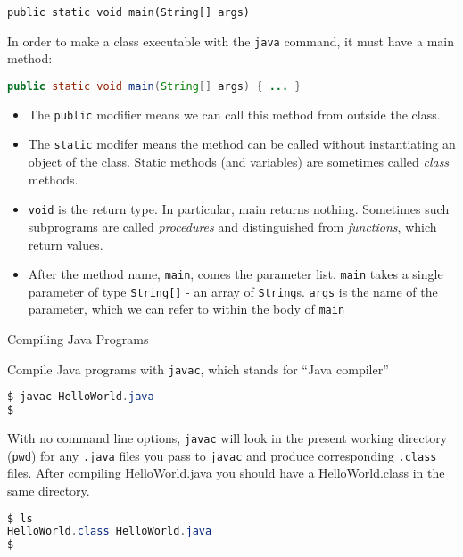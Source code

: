 \documentclass{beamer}
\begin{document}
\begin{frame}[fragile]{{\tt public static void main(String[] args)}}


In order to make a class executable with the {\tt java} command, it must have a main method:
\begin{lstlisting}[language=Java]
public static void main(String[] args) { ... }
\end{lstlisting}
\vspace{-.1in}
\begin{itemize}
\item The {\tt public} modifier means we can call this method from outside the class.
\item The {\tt static} modifer means the method can be called without instantiating an object of the class.  Static methods (and variables) are sometimes called {\it class} methods.
\item {\tt void} is the return type.  In particular, main returns nothing.  Sometimes such subprograms are called {\it procedures} and distinguished from {\it functions}, which return values.
\item After the method name, {\tt main}, comes the parameter list.  {\tt main} takes a single parameter of type {\tt String[]} - an array of {\tt String}s.  {\tt args} is the name of the parameter, which we can refer to within the body of {\tt main}
\end{itemize}

\end{frame}


\begin{frame}[fragile]{Compiling Java Programs}


Compile Java programs with {\tt javac}, which stands for ``Java compiler''
\begin{lstlisting}[language=Java]
$ javac HelloWorld.java
$
\end{lstlisting}
With no command line options, {\tt javac} will look in the present working directory ({\tt pwd}) for any {\tt .java} files you pass to {\tt javac} and produce corresponding {\tt .class} files.  After compiling HelloWorld.java you should have a HelloWorld.class in the same directory.

\begin{lstlisting}[language=Java]
$ ls
HelloWorld.class HelloWorld.java
$
\end{lstlisting}


\end{frame}
\end{document}
